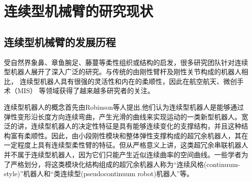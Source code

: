 \chapter{连续型机械臂的研究现状}
	\section{连续型机械臂的发展历程}

受自然界象鼻、章鱼腕足、藤蔓等柔性组织或结构的启发，很多研究团队针对连续型机器人展开了深入广泛的研究。与传统的由刚性臂杆及刚性关节构成的机器人相比， 连续型机器人具有很强的灵活性和内在的柔顺性，因此在航空航天\cite{walker_robot_2013}、微创手术（MIS） \cite{conrad_interleaved_2017,gilbert_elastic_2016} 等领域获得了越来越多研究者的关注。
 
连续型机器人的概念首先由Robinson等人提出\cite{robinson_continuum_1999},他们认为连续型机器人是能够通过弹性变形沿长度方向连续弯曲，产生光滑的曲线来实现运动的一类新型机器人。宽泛的讲，连续型机器人的决定性特征是具有能够连续变化的支撑结构，并且这种结构富有柔顺性。因此，由小段刚性模块和整体弹性支撑构成的超冗余机器人，其在一定程度上具有连续型柔性臂的特征。但从严格意义上讲，这类超冗余串联机器人并不属于连续型机器人，因为它们只能产生近似连续曲率的空间曲线。一些学者为了严格划分，将这类模块化结构组成的超冗余机器人称为“连续风格(continuum-style)”机器人\cite{walker_continuous_2013}和“类连续型(pseudocontinuum robot)机器人”\cite{burgner-kahrs_continuum_2015}等。

